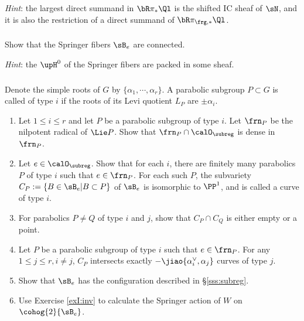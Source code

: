 {\em Hint}: the largest direct summand in $\bR\pi_{*}\Ql$ is the shifted IC sheaf of $\sN$, and it is also the restriction of a direct summand of $\bR\pi_{\frg,*}\Ql$.


\subsubsection{}\label{exI:conn} Show that the Springer fibers $\sB_{e}$ are connected. 

{\em Hint}: the $\upH^{0}$ of the Springer fibers are packed in some sheaf.


\subsubsection{} Denote the simple roots of $G$ by $\{\alpha_{1},\cdots,\alpha_{r}\}$. A parabolic subgroup $P\subset G$ is called of type $i$ if the roots of its Levi quotient $L_{P}$ are $\pm\alpha_{i}$.
\begin{enumerate}
\item Let $1\leq i\leq r$ and let $P$ be a parabolic subgroup of type $i$. Let $\frn_{P}$ be the nilpotent radical of $\Lie P$. Show that $\frn_{P}\cap \calO_{\subreg}$ is dense in $\frn_{P}$.
\item Let $e\in\calO_{\subreg}$. Show that for each $i$, there are finitely many parabolics $P$ of type $i$ such that $e\in\frn_{P}$. For each such $P$, the subvariety $C_{P}:=\{B\in\sB_{e}|B\subset P\}$ of $\sB_{e}$ is isomorphic to $\PP^{1}$, and is called a curve of type $i$.
\item For parabolics $P\neq Q$ of type $i$ and $j$, show that $C_{P}\cap C_{Q}$ is either empty or a point.
\item Let $P$ be a parabolic subgroup of type $i$ such that $e\in\frn_{P}$. For any $1\leq j\leq r, i\neq j$, $C_{P}$ intersects exactly $-\jiao{\alpha^{\vee}_{i}, \alpha_{j}}$ curves of type $j$.
\item Show that $\sB_{e}$ has the configuration described in \S\ref{sss:subreg}.
\item Use Exercise \ref{exI:inv} to calculate the Springer action of $W$ on $\cohog{2}{\sB_{e}}$.
\end{enumerate}






